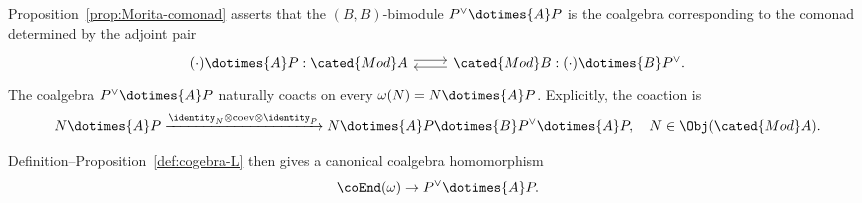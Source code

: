 Proposition~\ref{prop:Morita-comonad} asserts that the $(B,B)$-bimodule
$P^\vee\dotimes{A}P$ is the coalgebra corresponding to the comonad
determined by the adjoint pair
\begin{equation*}\begin{tikzcd}
	(\cdot) \dotimes{A} P : \cated{Mod}A \arrow[shift left, r] & \cated{Mod}B: (\cdot) \dotimes{B} P^\vee \arrow[shift left, l].
\end{tikzcd}\end{equation*}
The coalgebra $P^\vee\dotimes{A}P$ naturally coacts on every
$\omega(N)=N\dotimes{A}P$. Explicitly, the coaction is
\[ N \dotimes{A} P \xrightarrow{\identity_N \otimes \mathrm{coev} \otimes \identity_P} N \dotimes{A} P \dotimes{B} P^\vee \dotimes{A} P, \quad N \in \Obj(\cated{Mod}A). \]

Definition--Proposition~\ref{def:cogebra-L} then gives a canonical coalgebra
homomorphism
\[ \coEnd(\omega) \to P^\vee \dotimes{A} P. \]

